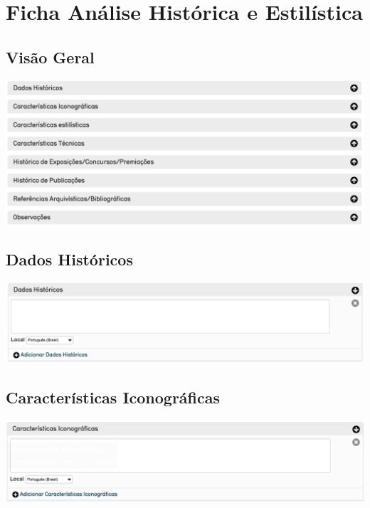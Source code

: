 \section{Ficha Análise Histórica e Estilística}
\subsection{Visão Geral}
\begin{flushleft}
	\includegraphics[width=\linewidth]{elementoFichaAnalise}
\end{flushleft}

\subsection{Dados Históricos}
\begin{flushleft}
	\includegraphics[width=\linewidth]{elemento-18}
\end{flushleft}

\subsection{Características Iconográficas}
\begin{flushleft}
	\includegraphics[width=\linewidth]{elemento-19}
\end{flushleft}


